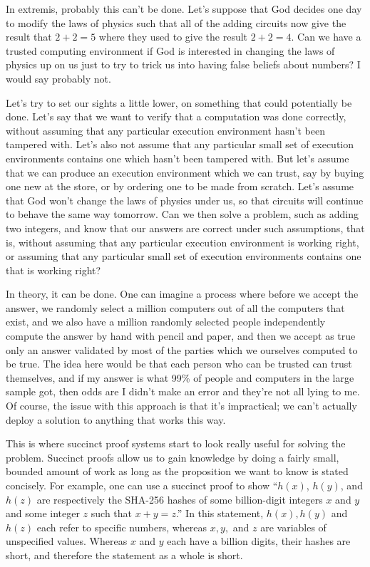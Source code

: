 \documentclass[11pt]{article}
\begin{document}
In extremis, probably this can't be done. Let's suppose that God decides one day
to modify the laws of physics such that all of the adding circuits now give
the result that $2+2=5$ where they used to give the result $2+2=4$. Can we have
a trusted computing environment if God is interested in changing the laws of physics
up on us just to try to trick us into having false beliefs about numbers? I would say
probably not.

Let's try to set our sights a little lower, on something that could potentially be done.
Let's say that we want to verify that a computation was done correctly, without
assuming that any particular execution environment hasn't been tampered with. Let's also
not assume that any particular small set of execution environments contains one which
hasn't been tampered with. But let's assume that we can produce an execution environment
which we can trust, say by buying one new at the store, or by ordering one to be made
from scratch. Let's assume that God won't change the laws of physics under us, so that
circuits will continue to behave the same way tomorrow. Can we then solve a problem,
such as adding two integers, and know that our answers are correct under such assumptions,
that is, without assuming that any particular execution environment is working right,
or assuming that any particular small set of execution environments contains one that is
working right?

In theory, it can be done. One can imagine a process where before we accept the answer,
we randomly select a million computers out of all the computers that exist, and we
also have a million randomly selected people independently compute the answer by hand with pencil and
paper, and then we accept as true only an answer validated by most of the parties
which we ourselves computed to be true. The idea here would be that each person who
can be trusted can trust themselves, and if my answer is what 99\% of people and computers
in the large sample got, then odds are I didn't make an error and they're not all lying to me. Of course,
the issue with this approach is that it's impractical; we can't actually deploy a solution
to anything that works this way.

This is where succinct proof systems start to look really useful for solving the problem.
Succinct proofs allow us to gain knowledge by doing a fairly small, bounded amount of work
as long as the proposition we want to know is stated concisely.
For example, one can use a succinct proof to show ``$h(x)$, $h(y)$, and $h(z)$ are
respectively the SHA-256 hashes of some billion-digit integers $x$ and $y$ and some
integer $z$ such that $x + y = z$.'' In this statement, $h(x), h(y)$ and $h(z)$ each
refer to specific numbers, whereas $x, y,$ and $z$ are variables of unspecified values.
Whereas $x$ and $y$ each have a billion digits, their hashes are short, and therefore
the statement as a whole is short.
\end{document}
